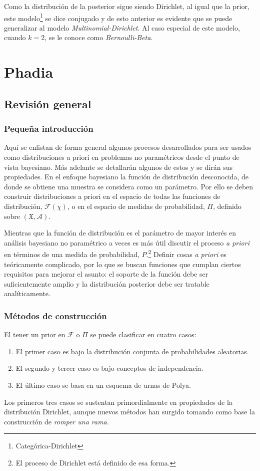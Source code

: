 \documentclass[runningheads,a4paper]{article}
\begin{document}
Como la distribución de la posterior sigue siendo Dirichlet, al igual que la prior, este %
modelo\footnote{Categórica-Dirichlet} se dice conjugado y de esto anterior es evidente que %
se puede generalizar al modelo \textit{Multinomial-Dirichlet}. Al caso especial de este modelo, %
cuando $k = 2$, se le conoce como \textit{Bernoulli-Beta}.

\section{Phadia}

\subsection{Revisión general}
\subsubsection{Pequeña introducción}

Aquí se enlistan de forma general algunos procesos desarrollados para ser usados como distribuciones a priori en problemas no paramétricos %
desde el punto de vista bayesiano. Más adelante se detallarán algunos de estos y se dirán sus propiedades. En el enfoque bayesiano %
la función de distribución desconocida, de donde se obtiene una muestra se considera como un parámetro. Por ello se deben construir %
distribuciones a priori en el espacio de todas las funciones de distribución, $\mathcal{F} \left( \chi \right)$, o en el espacio de %
medidas de probabilidad, $\Pi$, definido sobre $\left( \mathfrak{X}, \mathcal{A} \right)$.

Mientras que la función de distribución es el parámetro de mayor interés en análisis bayesiano no paramétrico a veces es más útil %
discutir el proceso \textit{a priori} en términos de una medida de probabilidad, $P$.\footnote{El proceso de Dirichlet está %
definido de esa forma.} %
Definir cosas \textit{a priori} es teóricamente complicado, por lo que se buscan funciones que cumplan ciertos requisitos para mejorar %
el asunto: el soporte de la función debe ser suficientemente amplio y la distribución posterior debe ser tratable analíticamente. 

\subsubsection{Métodos de construcción}

El tener un prior en $\mathcal{F}$ o $\Pi$ se puede clasificar en cuatro casos:
\begin{enumerate}
    \item El primer caso es bajo la distribución conjunta de probabilidades aleatorias.
    \item El segundo y tercer caso es bajo conceptos de independencia.
    \item El último caso se basa en un esquema de urnas de Polya.
\end{enumerate}
Los primeros tres casos se sustentan primordialmente en propiedades de la distribución Dirichlet, aunque nuevos métodos han surgido %
tomando como base la construcción de \textit{romper una rama}.
\end{document}
